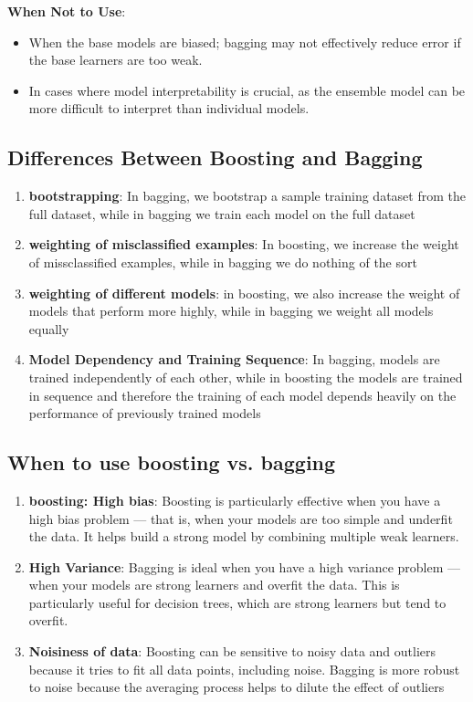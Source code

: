 \documentclass[12pt]{article}
\begin{document}
\textbf{When Not to Use}:
\begin{itemize}
    \item When the base models are biased; bagging may not effectively reduce error if the base learners are too weak.
    \item In cases where model interpretability is crucial, as the ensemble model can be more difficult to interpret than individual models.
\end{itemize}

\subsection{Differences Between Boosting and Bagging}
\begin{enumerate}
\item \textbf{bootstrapping}: In bagging, we bootstrap a sample training dataset from the full dataset, while in bagging we train each model on the full dataset
\item \textbf{weighting of misclassified examples}: In boosting, we increase the weight of missclassified examples, while in bagging we do nothing of the sort
\item \textbf{weighting of different models}: in boosting, we also increase the weight of models that perform more highly, while in bagging we weight all models equally
\item \textbf{Model Dependency and Training Sequence}: In bagging, models are trained independently of each other, while in boosting the models are trained in sequence and therefore the training of each model depends heavily on the performance of previously trained models
\end{enumerate}

\subsection{When to use boosting vs. bagging}
\begin{enumerate}
\item \textbf{boosting: High bias}: Boosting is particularly effective when you have a high bias problem — that is, when your models are too simple and underfit the data. It helps build a strong model by combining multiple weak learners.
\item \textbf{High Variance}: Bagging is ideal when you have a high variance problem — when your models are strong learners and overfit the data. This is particularly useful for decision trees, which are strong learners but tend to overfit.
\item \textbf{Noisiness of data}: Boosting can be sensitive to noisy data and outliers because it tries to fit all data points, including noise. Bagging is more robust to noise because the averaging process helps to dilute the effect of outliers
\end{enumerate}
\end{document}
